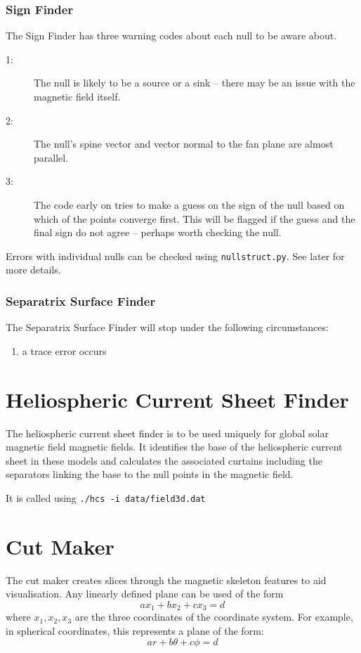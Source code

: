 \documentclass[12pt]{article}
\begin{document}
      \subsubsection{Sign Finder}
        The Sign Finder has three warning codes about each null to be aware about.
        \begin{description}
          \item [1:] The null is likely to be a source or a sink -- there may be an issue with the magnetic field itself.
          \item [2:] The null's spine vector and vector normal to the fan plane are almost parallel.
          \item [3:] The code early on tries to make a guess on the sign of the null based on which of the points converge first. This will be flagged if the guess and the final sign do not agree -- perhaps worth checking the null.
        \end{description}
        Errors with individual nulls can be checked using \texttt{nullstruct.py}. See later for more details.

      \subsubsection{Separatrix Surface Finder}
        The Separatrix Surface Finder will stop under the following circumstances:
        \begin{enumerate}
          \item a trace error occurs
        \end{enumerate}

  \section{Heliospheric Current Sheet Finder}

    The heliospheric current sheet finder is to be used uniquely for global solar magnetic field magnetic fields. It identifies the base of the heliospheric current sheet in these models and calculates the associated curtains including the separators linking the base to the null points in the magnetic field.

    It is called using \texttt{./hcs -i data/field3d.dat}

  \section{Cut Maker}

    The cut maker creates slices through the magnetic skeleton features to aid visualisation. Any linearly defined plane can be used of the form
      \[ a x_1 + b x_2 + c x_3 = d \]
    where \( x_1, x_2, x_3 \) are the three coordinates of the coordinate system.
    For example, in spherical coordinates, this represents a plane of the form:
      \[ a r + b \theta + c \phi = d \]
\end{document}
